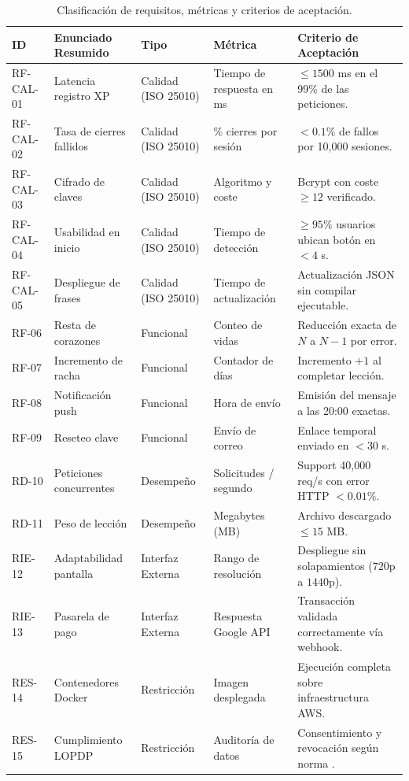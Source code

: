 \documentclass[11pt, a4paper]{article}
\begin{document}
\begin{table}[htbp]
\centering
\caption{Clasificación de requisitos, métricas y criterios de aceptación.}
\label{tab:clasificacion}
\small
\begin{tabularx}{\textwidth}{l X l X X}
\toprule
\textbf{ID} & \textbf{Enunciado Resumido} & \textbf{Tipo} & \textbf{Métrica} & \textbf{Criterio de Aceptación} \\
\midrule
RF-CAL-01 & Latencia registro XP & Calidad (ISO 25010) & Tiempo de respuesta en ms & $\le 1500$ ms en el 99\% de las peticiones. \\
RF-CAL-02 & Tasa de cierres fallidos & Calidad (ISO 25010) & \% cierres por sesión & $< 0.1\%$ de fallos por 10,000 sesiones. \\
RF-CAL-03 & Cifrado de claves & Calidad (ISO 25010) & Algoritmo y coste & Bcrypt con coste $\ge 12$ verificado. \\
RF-CAL-04 & Usabilidad en inicio & Calidad (ISO 25010) & Tiempo de detección & $\ge 95\%$ usuarios ubican botón en $< 4$ s. \\
RF-CAL-05 & Despliegue de frases & Calidad (ISO 25010) & Tiempo de actualización & Actualización JSON sin compilar ejecutable. \\
RF-06 & Resta de corazones & Funcional & Conteo de vidas & Reducción exacta de $N$ a $N-1$ por error. \\
RF-07 & Incremento de racha & Funcional & Contador de días & Incremento $+1$ al completar lección. \\
RF-08 & Notificación push & Funcional & Hora de envío & Emisión del mensaje a las 20:00 exactas. \\
RF-09 & Reseteo clave & Funcional & Envío de correo & Enlace temporal enviado en $< 30$ s. \\
RD-10 & Peticiones concurrentes & Desempeño & Solicitudes / segundo & Support 40,000 req/s con error HTTP $< 0.01\%$. \\
RD-11 & Peso de lección & Desempeño & Megabytes (MB) & Archivo descargado $\le 15$ MB. \\
RIE-12 & Adaptabilidad pantalla & Interfaz Externa & Rango de resolución & Despliegue sin solapamientos ($720\text{p}$ a $1440\text{p}$). \\
RIE-13 & Pasarela de pago & Interfaz Externa & Respuesta Google API & Transacción validada correctamente vía webhook. \\
RES-14 & Contenedores Docker & Restricción & Imagen desplegada & Ejecución completa sobre infraestructura AWS. \\
RES-15 & Cumplimiento LOPDP & Restricción & Auditoría de datos & Consentimiento y revocación según norma \cite{lopdp2021}. \\
\bottomrule
\end{tabularx}
\end{table}
\end{document}
